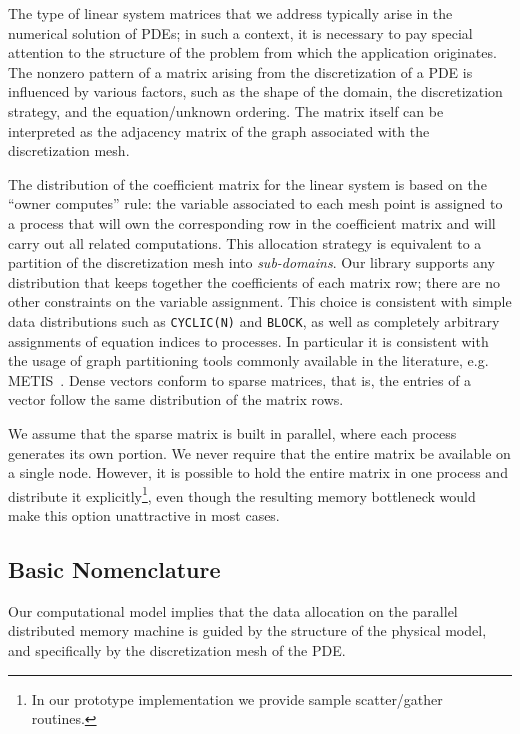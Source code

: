The type of linear system matrices that we address  typically arise in the
numerical solution of PDEs;  in such a context,
it is necessary to pay special attention to the
structure of the problem from which the application originates. 
The nonzero pattern of a matrix arising from the
discretization of a PDE is influenced by various factors, such as the
shape of the  domain, the discretization strategy, and
the equation/unknown ordering. The matrix itself can be interpreted as
the  adjacency matrix of the graph associated with the discretization
mesh. 

The distribution of the coefficient matrix for the linear system is
based on the ``owner computes'' rule: 
the variable associated to each mesh point is assigned to a process
that will  own the corresponding row in the coefficient matrix and
will  carry out all related computations. This allocation strategy 
is equivalent to a partition of the discretization mesh into {\em
sub-domains}. 
Our library  supports any distribution that keeps together 
the coefficients of each matrix row; there are no other constraints on
the variable assignment. 
This choice is consistent with simple  data distributions 
such as  \verb|CYCLIC(N)| and \verb|BLOCK|, 
as well as completely arbitrary assignments of
equation indices to processes. 
In particular it is consistent with the
usage of graph partitioning tools commonly available in the
literature, e.g. METIS~\cite{METIS}.
Dense vectors  conform  to sparse
matrices, that is, the entries of a vector follow the same distribution
of the matrix rows.  

We assume that the sparse matrix is built in parallel, where each
process generates its own portion. We never require that the entire
matrix be available on a single node. However, it is possible
to hold the entire matrix in one process and distribute it
explicitly\footnote{In our prototype implementation  we provide 
sample scatter/gather routines.}, even though  the resulting memory 
bottleneck would make this option unattractive in most  cases. 


\subsection{Basic Nomenclature}


Our computational model implies that the data allocation on the
parallel distributed memory machine is guided by the structure of the
physical model, and specifically by the discretization mesh of the
PDE. 


